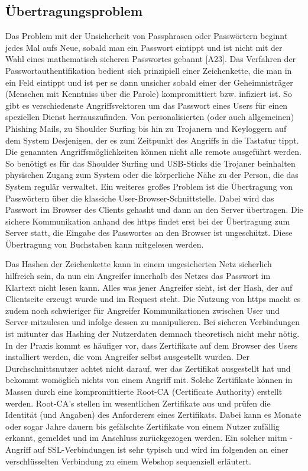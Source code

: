 \subsection{Übertragungsproblem}
Das Problem mit der Unsicherheit von Passphrasen oder Passwörtern beginnt jedes Mal aufs Neue, sobald man ein Passwort eintippt und ist nicht mit der Wahl eines mathematisch sicheren Passwortes gebannt [A23]. Das Verfahren der Passwortauthentifikation bedient sich prinzipiell einer Zeichenkette, die man in ein Feld eintippt und ist per se dann unsicher sobald einer der Geheimnisträger (Menschen mit Kenntniss über die Parole) kompromittiert bzw. infiziert ist. So gibt es verschiedenste Angriffsvektoren um das Passwort eines Users für einen speziellen Dienst herrauszufinden. Von personalisierten (oder auch allgemeinen) Phishing Mails, zu Shoulder Surfing bis hin zu Trojanern und Keyloggern \cite{A4} auf dem System Desjenigen, der es zum Zeitpunkt des Angriffs in die Tastatur tippt. Die genannten Angriffsmöglichkeiten können nicht alle remote ausgeführt werden. So benötigt es für das Shoulder Surfing und USB-Sticks die Trojaner beinhalten physischen Zugang zum System oder die körperliche Nähe zu der Person, die das System regulär verwaltet. Ein weiteres großes Problem ist die Übertragung von Passwörtern über die klassiche User-Browser-Schnittstelle. Dabei wird das Passwort im Browser des Clients gehasht und dann an den Server übertragen. Die sichere Kommunikation anhand des \ac{https} findet erst bei der Übertragung zum Server statt, die Eingabe des Passwortes an den Browser ist ungeschützt. Diese Übertragung von Buchstaben kann mitgelesen werden.

Das Hashen der Zeichenkette kann in einem ungesicherten Netz sicherlich hilfreich sein, da nun ein Angreifer innerhalb des Netzes das Passwort im Klartext nicht lesen kann. Alles was jener Angreifer sieht, ist der Hash, der auf Clientseite erzeugt wurde und im Request steht. Die Nutzung von \ac{https} macht es zudem noch schwieriger für Angreifer Kommunikationen zwischen User und Server mitzulesen und infolge dessen zu manipulieren. Bei sicheren Verbindungen ist mitunter das Hashing der Nutzerdaten demnach theoretisch nicht mehr nötig. In der Praxis kommt es häufiger vor, dass Zertifikate auf dem Browser des Users installiert werden, die vom Angreifer selbst ausgestellt wurden. Der Durchschnittsnutzer achtet nicht darauf, wer das Zertifikat ausgestellt hat und bekommt womöglich nichts von einem Angriff mit. Solche Zertifikate können in Massen durch eine kompromittierte Root-CA (Certificate Authority) erstellt werden. Root-CA's stellen im wesentlichen Zertifikate aus und prüfen die Identität (und Angaben) des Anforderers eines Zertifikats. Dabei kann es Monate oder sogar Jahre dauern bis gefälschte Zertifikate von einem Nutzer zufällig erkannt, gemeldet und im Anschluss zurückgezogen werden. Ein solcher \ac{mitm} - Angriff auf SSL-Verbindungen ist sehr typisch und wird im folgenden an einer verschlüsselten Verbindung zu einem Webshop sequenziell erläutert.

